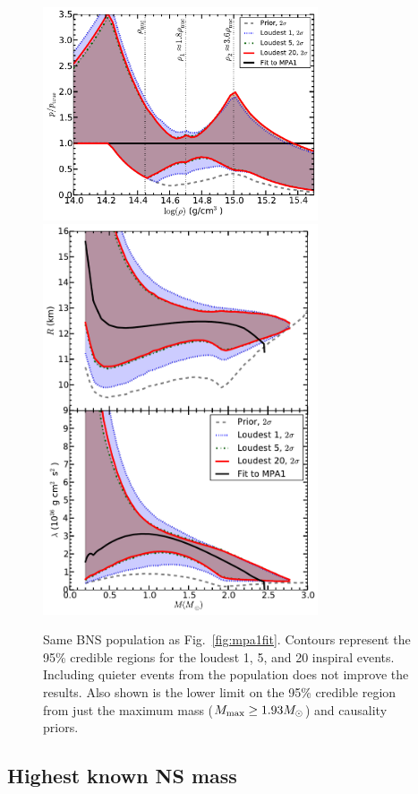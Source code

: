 \documentclass[twocolumn,prd,amssymb,aps,nofootinbib,showpacs,epsf]{revtex4}
\begin{document}
\begin{figure}[!htb]
\begin{center}
\includegraphics[width=3.2in]{LALMCMCmpa1FitTaylorF2ZeroNoiseperror.pdf}\\
\includegraphics[width=3.2in]{LALMCMCmpa1FitTaylorF2ZeroNoiseRadiuslambda.pdf}
\caption{Same BNS population as Fig.~\ref{fig:mpa1fit}. Contours represent the 95\% credible regions for the loudest 1, 5, and 20 inspiral events. Including quieter events from the population does not improve the results. Also shown is the lower limit on the 95\% credible region from just the maximum mass ($M_{\rm \max} \geq 1.93M_\odot$) and causality priors.}
\label{fig:mpa1fitofn}
\end{center}
\end{figure}


\subsection{Highest known NS mass}
\end{document}
